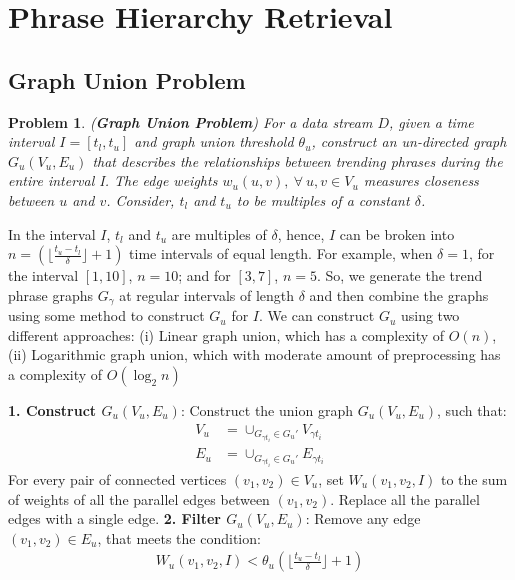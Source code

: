 \documentclass{sig-alternate}
\newtheorem{problem}{Problem}
\begin{document}
\section{Phrase Hierarchy Retrieval}
\label{sec:phrase-hierarchy-retrieval}

\subsection{Graph Union Problem}
\begin{problem}(\textbf{Graph Union Problem})
For a data stream $D$, given a time interval $I = [t_l, t_u]$ and graph union threshold $\theta_u$, construct an un-directed graph $G_u(V_u, E_u)$ that describes the relationships between trending phrases during the entire interval I. The edge weights $w_u(u, v),\ \forall\ u, v \in V_u$ measures closeness between $u$ and $v$. Consider, $t_l$ and $t_u$ to be multiples of a constant $\delta$.
\end{problem}

In the interval $I$, $t_l$ and $t_u$ are multiples of $\delta$, hence, $I$ can be broken into $n =  \left( \lfloor \frac{t_u - t_l}{\delta} \rfloor + 1 \right)$ time intervals of equal length. For example, when $\delta = 1$, for the interval $[1,10]$, $n=10$; and for $[3,7]$, $n=5$. So, we generate the trend phrase graphs $G_\gamma$ at regular intervals of length $\delta$ and then combine the graphs using some method to construct $G_u$ for $I$. We can construct $G_u$ using two different approaches: (i) Linear graph union, which has a complexity of $O(n)$, (ii) Logarithmic graph union, which with moderate amount of preprocessing has a complexity of $O(\log_2{n})$

\newcommand{\GraphUnion}{\ensuremath{\mbox{\sc GraphUnion}}}
\begin{algorithm}[t]
\caption{$\GraphUnion(G_u', I, \theta_u)$}
\begin{algorithmic}
\STATE \textbf{1. Construct  $G_u(V_u, E_u)$}: Construct the union graph $G_u(V_u, E_u)$, such that:
\begin{align*}
V_u &= \cup_{G_{\gamma t_i} \in G_u'} V_{\gamma t_i} \\
E_u &= \cup_{G_{\gamma t_i} \in G_u'} E_{\gamma t_i}
\end{align*} 
For every pair of connected vertices $(v_1, v_2) \in V_u$, set $ W_u(v_1, v_2, I)$ to the sum of weights of all the parallel edges between $(v_1, v_2)$. Replace all the parallel edges with a single edge.
\STATE \textbf{2. Filter  $G_u(V_u, E_u)$}:  Remove any edge $(v_1, v_2) \in E_u$, that meets the condition:
 \begin{align*}
 W_u(v_1, v_2, I) < \theta_u \left( \lfloor\frac{t_u - t_l}{\delta}\rfloor + 1\right)
\end{align*} 
\end{algorithmic}
\label{alg:graph-union}
\end{algorithm}
\end{document}
